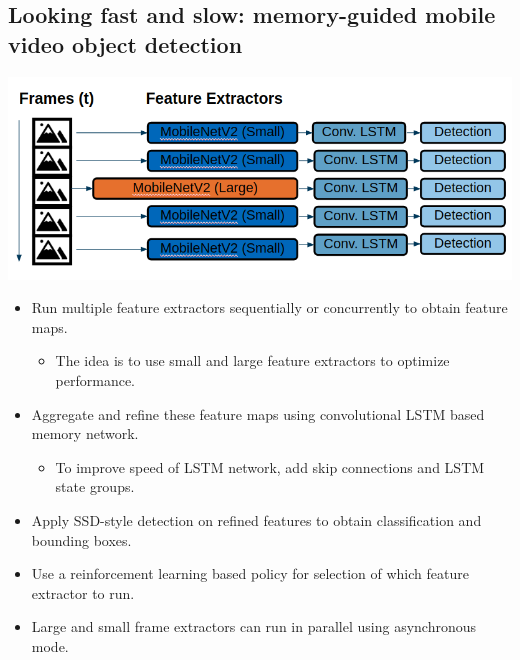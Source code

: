 \documentclass[conference]{IEEEtran}
\begin{document}
\subsection{Looking fast and slow: memory-guided mobile video object detection}
\includegraphics[width=\columnwidth]{looking-fast-and-slow-architecture}
\begin{itemize}
	\item Run multiple feature extractors sequentially or concurrently to obtain feature maps.
	\begin{itemize}
		\item 	The idea is to use small and large feature extractors to optimize performance.
	\end{itemize}
	\item Aggregate and refine these feature maps using convolutional LSTM based memory network.
	\begin{itemize}
		\item To improve speed of LSTM network, add skip connections and LSTM state groups.
	\end{itemize}
	\item Apply SSD-style detection on refined features to obtain classification and bounding boxes.
	\item Use a reinforcement learning based policy for selection of which feature extractor to run.
	\item Large and small frame extractors can run in parallel using asynchronous mode.
\end{itemize}
\end{document}
